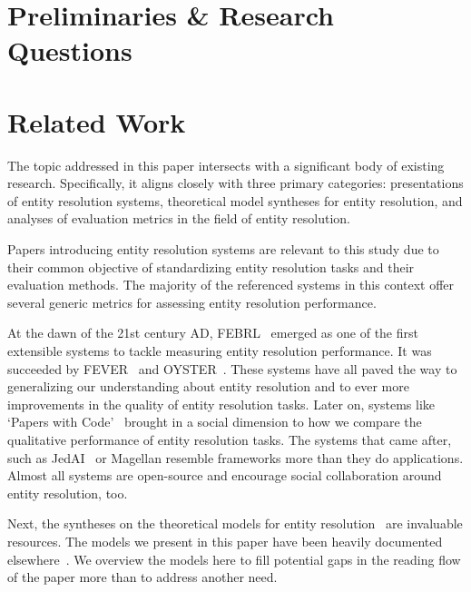 \documentclass[journal]{IEEEtran}
\begin{document}
    \section{Preliminaries \& Research Questions}\label{sec:Preliminaries & Questions}
    

    \section{Related Work}\label{sec:Related Work}
    
    The topic addressed in this paper intersects with a significant body of
    existing research.
    Specifically, it aligns closely with three primary categories: presentations
    of entity resolution systems, theoretical model syntheses for entity
    resolution, and analyses of evaluation metrics in the field of entity
    resolution.

    Papers introducing entity resolution systems are relevant to this study due
    to their common objective of standardizing entity resolution tasks and their
    evaluation methods.
    The majority of the referenced systems in this context offer several generic
    metrics for assessing entity resolution performance.

    At the dawn of the 21st century AD, FEBRL~\cite{febrl2002} emerged as one of
    the first extensible systems to tackle measuring entity resolution
    performance.
    It was succeeded by FEVER~\cite{fever2009} and OYSTER~\cite{oyster2012}.
    These systems have all paved the way to generalizing our understanding about
    entity resolution and to ever more improvements in the quality of entity
    resolution tasks.
    Later on, systems like `Papers with Code'~\cite{papwithcode2019} brought in
    a social dimension to how we compare the qualitative performance of entity
    resolution tasks.
    The systems that came after, such as JedAI~\cite{jedai2017} or Magellan
    \cite{magellan2020} resemble frameworks more than they do
    applications.
    Almost all systems are open-source and encourage social collaboration around
    entity resolution, too.
    
    Next, the syntheses on the theoretical models for entity
    resolution~\cite{fs1969,Ben2009Swoosh,Tal11} are invaluable resources.
    The models we present in this paper have been heavily documented
    elsewhere~\cite{Tal11,tal2013}.    
    We overview the models here to fill potential gaps in the reading flow of
    the paper more than to address another need.
    
\end{document}
